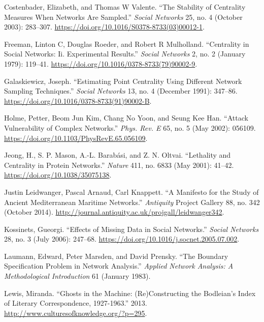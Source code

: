 \documentclass[]{article}
\begin{document}
\leavevmode\hypertarget{ref-costenbader_stability_2003}{}%
Costenbader, Elizabeth, and Thomas W Valente. ``The Stability of Centrality Measures When Networks Are Sampled.'' \emph{Social Networks} 25, no. 4 (October 2003): 283--307. \url{https://doi.org/10.1016/S0378-8733(03)00012-1}.

\leavevmode\hypertarget{ref-freeman_centrality_1979}{}%
Freeman, Linton C, Douglas Roeder, and Robert R Mulholland. ``Centrality in Social Networks: Ii. Experimental Results.'' \emph{Social Networks} 2, no. 2 (January 1979): 119--41. \url{https://doi.org/10.1016/0378-8733(79)90002-9}.

\leavevmode\hypertarget{ref-galaskiewicz_estimating_1991}{}%
Galaskiewicz, Joseph. ``Estimating Point Centrality Using Different Network Sampling Techniques.'' \emph{Social Networks} 13, no. 4 (December 1991): 347--86. \url{https://doi.org/10.1016/0378-8733(91)90002-B}.

\leavevmode\hypertarget{ref-holme_attack_2002}{}%
Holme, Petter, Beom Jun Kim, Chang No Yoon, and Seung Kee Han. ``Attack Vulnerability of Complex Networks.'' \emph{Phys. Rev. E} 65, no. 5 (May 2002): 056109. \url{https://doi.org/10.1103/PhysRevE.65.056109}.

\leavevmode\hypertarget{ref-jeong_lethality_2001}{}%
Jeong, H., S. P. Mason, A.-L. Barabási, and Z. N. Oltvai. ``Lethality and Centrality in Protein Networks.'' \emph{Nature} 411, no. 6833 (May 2001): 41--42. \url{https://doi.org/10.1038/35075138}.

\leavevmode\hypertarget{ref-leidwanger_manifesto_2014}{}%
Justin Leidwanger, Pascal Arnaud, Carl Knappett. ``A Manifesto for the Study of Ancient Mediterranean Maritime Networks.'' \emph{Antiquity} Project Gallery 88, no. 342 (October 2014). \url{http://journal.antiquity.ac.uk/projgall/leidwanger342}.

\leavevmode\hypertarget{ref-kossinets_effects_2006}{}%
Kossinets, Gueorgi. ``Effects of Missing Data in Social Networks.'' \emph{Social Networks} 28, no. 3 (July 2006): 247--68. \url{https://doi.org/10.1016/j.socnet.2005.07.002}.

\leavevmode\hypertarget{ref-laumann_boundary_1983}{}%
Laumann, Edward, Peter Marsden, and David Prensky. ``The Boundary Specification Problem in Network Analysis.'' \emph{Applied Network Analysis: A Methodological Introduction} 61 (January 1983).

\leavevmode\hypertarget{ref-lewis_ghosts_2013}{}%
Lewis, Miranda. ``Ghosts in the Machine: (Re)Constructing the Bodleian's Index of Literary Correspondence, 1927-1963.'' 2013. \url{http://www.culturesofknowledge.org/?p=295}.
\end{document}
